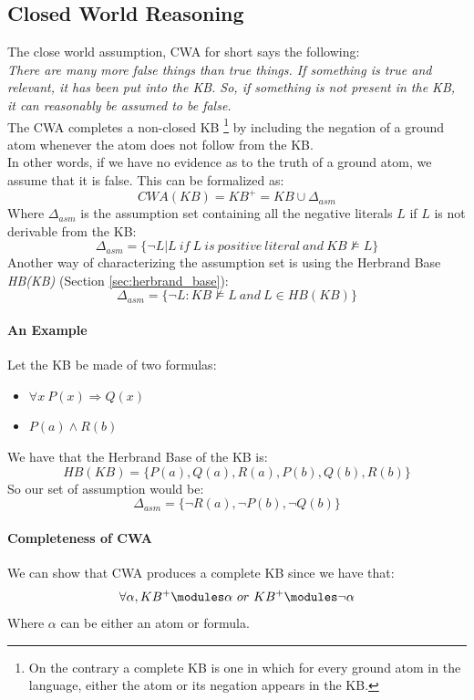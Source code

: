 \documentclass[10pt,a4paper]{article}
\begin{document}
\begin{itemize}
\subsection{Closed World Reasoning}
The close world assumption, CWA for short says the following:\\
\textit{There are many more false things than true things. If something is true and relevant, it has been put into the KB. So, if something is not present in the KB, it can reasonably be assumed to be false.}\\
The CWA completes a non-closed KB \footnote{On the contrary a complete KB is one in which for every ground atom in the language, either the atom or its negation appears in the KB. } by including the negation of a ground atom whenever the atom does not follow from the KB.\\
In other words, if we have no evidence as to the truth of a ground atom, we assume that it is false. This can be formalized as:
\[CWA(KB)=KB^+=KB \cup \Delta_{asm}\]
Where $\Delta_{asm}$ is the assumption set containing all the negative literals $L$ if $L$ is not derivable from the KB:
\[\Delta_{asm}=\{\neg L | L\ if\ L\ is\ positive\ literal\ and\ KB \nvDash L\}\]
Another way of characterizing the assumption set is using the Herbrand Base \textit{HB(KB)} (Section \ref{sec:herbrand_base}):
\[\Delta_{asm}=\{\neg L : KB \nvDash L\ and\ L\in HB(KB)\}\]

\paragraph{An Example}
Let the KB be made of two formulas:
\begin{itemize}
\item $\forall x\ P(x) \Rightarrow Q(x)$
\item $P(a)\wedge R(b)$
\end{itemize}
We have that the Herbrand Base of the KB is:
\[HB(KB)=\lbrace P(a), Q(a), R(a), P(b), Q(b), R(b) \rbrace\]
So our set of assumption would be:
\[\Delta_{asm}=\lbrace \neg R(a), \neg P(b), \neg Q(b) \rbrace\]


\paragraph{Completeness of CWA}
We can show that CWA produces a complete KB since we have that:
\[\forall \alpha, KB^+ \modules \alpha\ or\ KB^+ \modules \neg \alpha\]
Where $\alpha$ can be either an atom or formula. 


\end{itemize}
\end{document}
